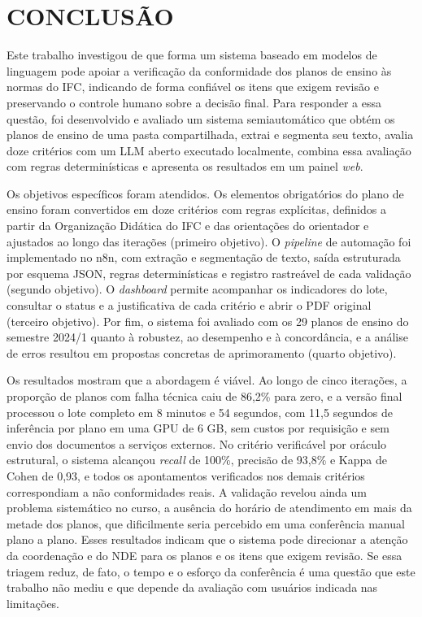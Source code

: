\chapter{CONCLUSÃO}
\label{cap:conclusao}

Este trabalho investigou de que forma um sistema baseado em modelos de linguagem pode apoiar a verificação da conformidade dos planos de ensino às normas do IFC, indicando de forma confiável os itens que exigem revisão e preservando o controle humano sobre a decisão final. Para responder a essa questão, foi desenvolvido e avaliado um sistema semiautomático que obtém os planos de ensino de uma pasta compartilhada, extrai e segmenta seu texto, avalia doze critérios com um LLM aberto executado localmente, combina essa avaliação com regras determinísticas e apresenta os resultados em um painel \textit{web}.

Os objetivos específicos foram atendidos. Os elementos obrigatórios do plano de ensino foram convertidos em doze critérios com regras explícitas, definidos a partir da Organização Didática do IFC e das orientações do orientador e ajustados ao longo das iterações (primeiro objetivo). O \textit{pipeline} de automação foi implementado no n8n, com extração e segmentação de texto, saída estruturada por esquema JSON, regras determinísticas e registro rastreável de cada validação (segundo objetivo). O \textit{dashboard} permite acompanhar os indicadores do lote, consultar o status e a justificativa de cada critério e abrir o PDF original (terceiro objetivo). Por fim, o sistema foi avaliado com os 29 planos de ensino do semestre 2024/1 quanto à robustez, ao desempenho e à concordância, e a análise de erros resultou em propostas concretas de aprimoramento (quarto objetivo).

Os resultados mostram que a abordagem é viável. Ao longo de cinco iterações, a proporção de planos com falha técnica caiu de 86,2\% para zero, e a versão final processou o lote completo em 8 minutos e 54 segundos, com 11,5 segundos de inferência por plano em uma GPU de 6 GB, sem custos por requisição e sem envio dos documentos a serviços externos. No critério verificável por oráculo estrutural, o sistema alcançou \textit{recall} de 100\%, precisão de 93,8\% e Kappa de Cohen de 0,93, e todos os apontamentos verificados nos demais critérios correspondiam a não conformidades reais. A validação revelou ainda um problema sistemático no curso, a ausência do horário de atendimento em mais da metade dos planos, que dificilmente seria percebido em uma conferência manual plano a plano. Esses resultados indicam que o sistema pode direcionar a atenção da coordenação e do NDE para os planos e os itens que exigem revisão. Se essa triagem reduz, de fato, o tempo e o esforço da conferência é uma questão que este trabalho não mediu e que depende da avaliação com usuários indicada nas limitações.

